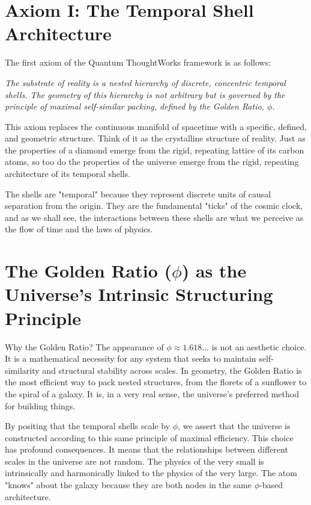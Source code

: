 \documentclass[12pt]{report}
\begin{document}
\section{Axiom I: The Temporal Shell Architecture}
The first axiom of the Quantum ThoughtWorks framework is as follows:

\textit{The substrate of reality is a nested hierarchy of discrete, concentric temporal shells. The geometry of this hierarchy is not arbitrary but is governed by the principle of maximal self-similar packing, defined by the Golden Ratio, $\phi$.}

This axiom replaces the continuous manifold of spacetime with a specific, defined, and geometric structure. Think of it as the crystalline structure of reality. Just as the properties of a diamond emerge from the rigid, repeating lattice of its carbon atoms, so too do the properties of the universe emerge from the rigid, repeating architecture of its temporal shells.

The shells are "temporal" because they represent discrete units of causal separation from the origin. They are the fundamental "ticks" of the cosmic clock, and as we shall see, the interactions between these shells are what we perceive as the flow of time and the laws of physics.

\section{The Golden Ratio (\texorpdfstring{$\phi$}{φ}) as the Universe's Intrinsic Structuring Principle}
Why the Golden Ratio? The appearance of $\phi \approx 1.618\ldots$ is not an aesthetic choice. It is a mathematical necessity for any system that seeks to maintain self-similarity and structural stability across scales. In geometry, the Golden Ratio is the most efficient way to pack nested structures, from the florets of a sunflower to the spiral of a galaxy. It is, in a very real sense, the universe's preferred method for building things.

By positing that the temporal shells scale by $\phi$, we assert that the universe is constructed according to this same principle of maximal efficiency. This choice has profound consequences. It means that the relationships between different scales in the universe are not random. The physics of the very small is intrinsically and harmonically linked to the physics of the very large. The atom "knows" about the galaxy because they are both nodes in the same $\phi$-based architecture.
\end{document}
